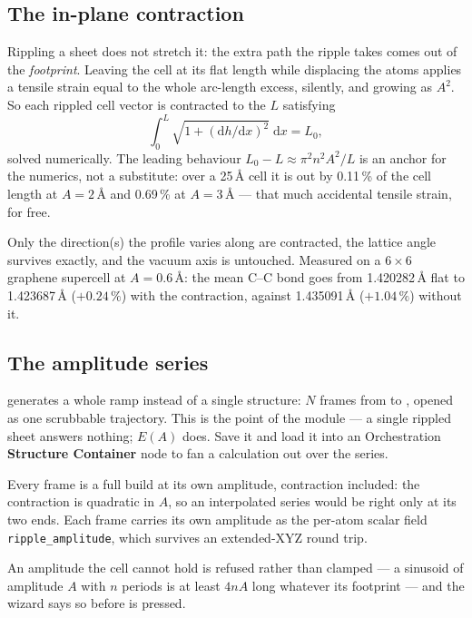 \subsection{The in-plane contraction}

Rippling a sheet does not stretch it: the extra path the ripple takes comes
out of the \emph{footprint}. Leaving the cell at its flat length while
displacing the atoms applies a tensile strain equal to the whole arc-length
excess, silently, and growing as $A^2$. So each rippled cell vector is
contracted to the $L$ satisfying
\[
  \int_0^{L}\sqrt{1 + (\mathrm{d}h/\mathrm{d}x)^2}\;\mathrm{d}x = L_0 ,
\]
solved numerically. The leading behaviour $L_0 - L \approx \pi^2 n^2 A^2/L$
is an anchor for the numerics, not a substitute: over a 25\,\AA{} cell it is
out by 0.11\,\% of the cell length at $A = 2$\,\AA{} and 0.69\,\% at
$A = 3$\,\AA{} --- that much accidental tensile strain, for free.

Only the direction(s) the profile varies along are contracted, the lattice
angle survives exactly, and the vacuum axis is untouched. Measured on a
$6\times6$ graphene supercell at $A = 0.6$\,\AA: the mean C--C bond goes from
1.420282\,\AA{} flat to 1.423687\,\AA{} ($+0.24\,\%$) with the contraction,
against 1.435091\,\AA{} ($+1.04\,\%$) without it.

\subsection{The amplitude series}

 generates a whole ramp instead of a single structure:
$N$ frames from  to , opened as one scrubbable
trajectory. This is the point of the module --- a single rippled sheet
answers nothing; $E(A)$ does. Save it and load it into an Orchestration
\textbf{Structure Container} node to fan a calculation out over the series.

Every frame is a full build at its own amplitude, contraction included: the
contraction is quadratic in $A$, so an interpolated series would be right
only at its two ends. Each frame carries its own amplitude as the per-atom
scalar field \texttt{ripple\_amplitude}, which survives an extended-XYZ round
trip.

An amplitude the cell cannot hold is refused rather than clamped --- a
sinusoid of amplitude $A$ with $n$ periods is at least $4nA$ long whatever
its footprint --- and the wizard says so before  is pressed.
